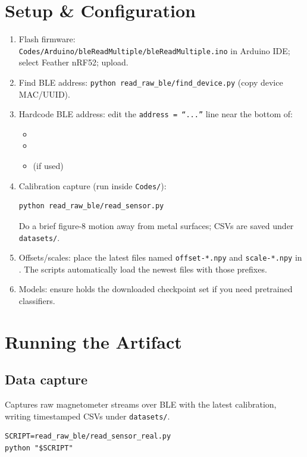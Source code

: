 \documentclass[conference]{IEEEtran}
\begin{document}
\section{Setup \& Configuration}
\label{sec:setup}
\begin{enumerate}
  \item Flash firmware:\\
  {\scriptsize\texttt{Codes/Arduino/bleReadMultiple/bleReadMultiple.ino}} in Arduino IDE;\\
  select Feather nRF52; upload.
  \item Find BLE address: \texttt{python read\_raw\_ble/find\_device.py} (copy device MAC/UUID).
  \item Hardcode BLE address: edit the \texttt{address = ``...''} line near the bottom of:
  \begin{itemize}
    \item {}
    \item {}
    \item {} (if used)
  \end{itemize}
  \item Calibration capture (run inside \texttt{Codes/}):\\
  \begin{verbatim}
python read_raw_ble/read_sensor.py
  \end{verbatim}
  Do a brief figure-8 motion away from metal surfaces; CSVs are saved under \texttt{datasets/}.
  \item Offsets/scales: place the latest files named \texttt{offset-*.npy} and \texttt{scale-*.npy} in . The scripts automatically load the newest files with those prefixes.
  \item Models: ensure  holds the downloaded checkpoint set if you need pretrained classifiers.
\end{enumerate}

\section{Running the Artifact}
\label{sec:running}
\subsection{Data capture}
\noindent Captures raw magnetometer streams over BLE with the latest calibration, writing timestamped CSVs under \texttt{datasets/}.
\begin{verbatim}
SCRIPT=read_raw_ble/read_sensor_real.py
python "$SCRIPT"
\end{verbatim}
\end{document}
